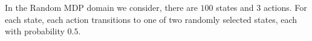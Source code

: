
In the Random \ac{MDP} domain we consider, there are $100$ states and $3$ actions. For each state, each action transitions to one of two randomly selected states, each with probability $0.5$.


